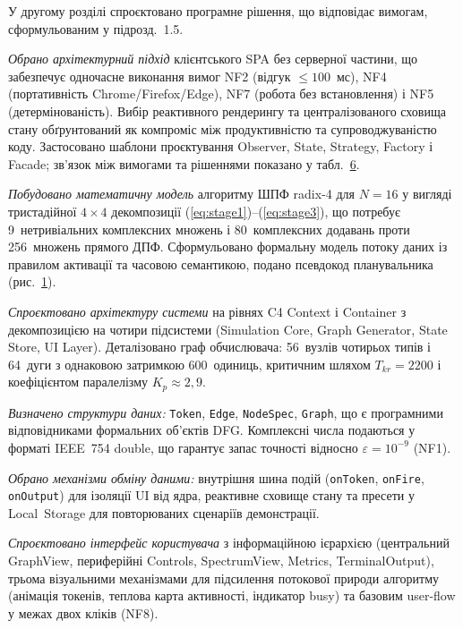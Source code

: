 У другому розділі спроєктовано програмне рішення, що відповідає вимогам,
сформульованим у підрозд.~1.5.

\emph{Обрано архітектурний підхід} клієнтського SPA без серверної
частини, що забезпечує одночасне виконання вимог NF2 (відгук
\(\leq 100\)~мс), NF4 (портативність Chrome/Firefox/Edge), NF7 (робота
без встановлення) і NF5 (детермінованість). Вибір реактивного рендерингу
та централізованого сховища стану обґрунтований як компроміс між
продуктивністю та супроводжуваністю коду. Застосовано шаблони
проєктування Observer, State, Strategy, Factory і Facade; зв'язок між
вимогами та рішеннями показано у табл.~\hyperref[tab:req_to_tech]{6}.

\emph{Побудовано математичну модель} алгоритму ШПФ radix-4 для
\(N = 16\) у вигляді тристадійної \(4 \times 4\) декомпозиції
(\hyperref[eq:stage1]{{[}eq:stage1{]}})--(\hyperref[eq:stage3]{{[}eq:stage3{]}}),
що потребує 9~нетривіальних комплексних множень і 80~комплексних
додавань проти 256~множень прямого ДПФ. Сформульовано формальну модель
потоку даних із правилом активації та часовою семантикою, подано
псевдокод планувальника (рис.~\hyperref[fig:tick_pseudo]{1}).

\emph{Спроєктовано архітектуру системи} на рівнях C4 Context і Container
з декомпозицією на чотири підсистеми (Simulation Core, Graph Generator,
State Store, UI Layer). Деталізовано граф обчислювача: 56~вузлів
чотирьох типів і 64~дуги з однаковою затримкою 600~одиниць, критичним
шляхом \(T_{kr} = 2200\) і коефіцієнтом паралелізму
\(K_{p} \approx 2,9\).

\emph{Визначено структури даних:} \texttt{Token}, \texttt{Edge},
\texttt{NodeSpec}, \texttt{Graph}, що є програмними відповідниками
формальних об'єктів DFG. Комплексні числа подаються у форматі IEEE~754
double, що гарантує запас точності відносно \(\varepsilon = 10^{- 9}\)
(NF1).

\emph{Обрано механізми обміну даними:} внутрішня шина подій
(\texttt{onToken}, \texttt{onFire}, \texttt{onOutput}) для ізоляції UI
від ядра, реактивне сховище стану та пресети у Local~Storage для
повторюваних сценаріїв демонстрації.

\emph{Спроєктовано інтерфейс користувача} з інформаційною ієрархією
(центральний GraphView, периферійні Controls, SpectrumView, Metrics,
TerminalOutput), трьома візуальними механізмами для підсилення потокової
природи алгоритму (анімація токенів, теплова карта активності, індикатор
busy) та базовим user-flow у межах двох кліків (NF8).


